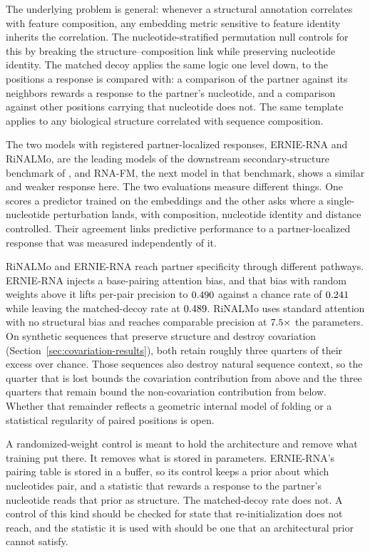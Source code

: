 \documentclass[11pt]{article}
\begin{document}
The underlying problem is general: whenever a structural annotation
correlates with feature composition, any embedding metric sensitive to
feature identity inherits the correlation. The nucleotide-stratified
permutation null controls for this by breaking the structure--composition
link while preserving nucleotide identity. The matched decoy applies the same
logic one level down, to the positions a response is compared with: a
comparison of the partner against its neighbors rewards a response to the
partner's nucleotide, and a comparison against other positions carrying that
nucleotide does not. The same template applies to any biological structure
correlated with sequence composition.

The two models with registered partner-localized responses, ERNIE-RNA and
RiNALMo, are the leading models of the downstream secondary-structure
benchmark of \citet{zablocki2025benchmarking}, and RNA-FM, the next model in
that benchmark, shows a similar and weaker response here. The two evaluations
measure different things. One scores a predictor trained on the embeddings and
the other asks where a single-nucleotide perturbation lands, with composition,
nucleotide identity and distance controlled. Their agreement links predictive
performance to a partner-localized response that was measured independently of
it.

RiNALMo and ERNIE-RNA reach partner specificity through different pathways.
ERNIE-RNA injects a base-pairing attention bias, and that bias with random
weights above it lifts per-pair precision to $0.490{}$
against a chance rate of $0.241{}$ while leaving the
matched-decoy rate at $0.489{}$. RiNALMo uses standard
attention with no structural bias and reaches comparable precision at
$7.5{}\times$ the parameters. On synthetic sequences that preserve
structure and destroy covariation (Section~\ref{sec:covariation-results}), both
retain roughly three quarters of their excess over chance. Those sequences also
destroy natural sequence context, so the quarter that is lost bounds the
covariation contribution from above and the three quarters that remain bound
the non-covariation contribution from below. Whether that remainder reflects a
geometric internal model of folding or a statistical regularity of paired
positions is open.

A randomized-weight control is meant to hold the architecture and remove what
training put there. It removes what is stored in parameters. ERNIE-RNA's
pairing table is stored in a buffer, so its control keeps a prior about which
nucleotides pair, and a statistic that rewards a response to the partner's
nucleotide reads that prior as structure. The matched-decoy rate does not. A
control of this kind should be checked for state that re-initialization does
not reach, and the statistic it is used with should be one that an
architectural prior cannot satisfy.
\end{document}

